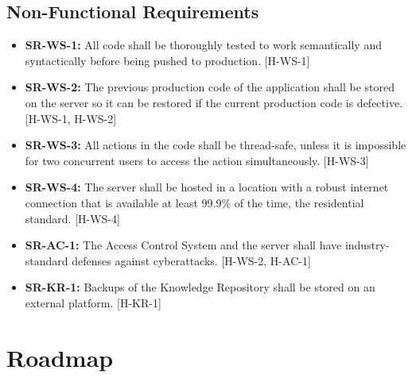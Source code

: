 \documentclass{article}
\begin{document}
\subsection{Non-Functional Requirements}

\begin{itemize}
    \item \textbf{SR-WS-1:} All code shall be thoroughly tested to work semantically and syntactically before 
    being pushed to production. [H-WS-1]
    \item \textbf{SR-WS-2:} The previous production code of the application shall be stored on the server so
    it can be restored if the current production code is defective. [H-WS-1, H-WS-2]
    \item \textbf{SR-WS-3:} All actions in the code shall be thread-safe, unless it is impossible for two
    concurrent users to access the action simultaneously. [H-WS-3]
    \item \textbf{SR-WS-4:} The server shall be hosted in a location with a robust internet connection that is
    available at least 99.9\% of the time, the residential standard. [H-WS-4]
    \item \textbf{SR-AC-1:} The Access Control System and the server shall have industry-standard defenses against cyberattacks. [H-WS-2, H-AC-1]
    \item \textbf{SR-KR-1:} Backups of the Knowledge Repository shall be stored on an external platform. [H-KR-1]
    
\end{itemize}

\section{Roadmap} \label{SecRoadmap}
\end{document}

